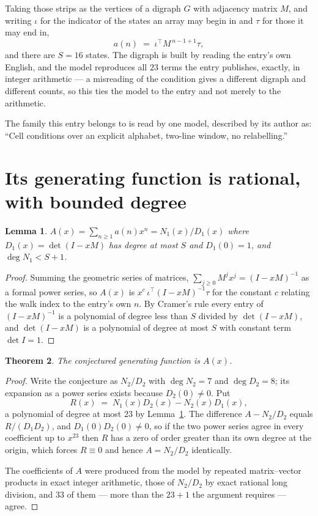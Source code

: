 \documentclass[11pt,a4paper]{article}
\theoremstyle{plain}
\newtheorem{theorem}{Theorem}
\newtheorem{lemma}[theorem]{Lemma}
\theoremstyle{definition}
\begin{document}
Taking those strips as the vertices of a digraph $G$ with adjacency matrix $M$, and writing
$\iota$ for the indicator of the states an array may begin in and $\tau$ for those it may end
in,
\[
a(n)\;=\;\iota^{\!\top}M^{\,n-1+1}\tau ,
\]
and there are $S=16$ states. The digraph is built by reading the entry's own English, and the
model reproduces all $23$ terms the entry publishes, exactly, in integer arithmetic --- a
misreading of the condition gives a different digraph and different counts, so this ties the
model to the entry and not merely to the arithmetic.

The family this entry belongs to is read by one model, described by its author as: ``Cell conditions over an explicit alphabet, two-line window, no relabelling.''


\section{Its generating function is rational, with bounded degree}

\begin{lemma}\label{lem:rat}
$A(x)=\sum_{n\ge1}a(n)x^n=N_1(x)/D_1(x)$ where $D_1(x)=\det(I-xM)$ has degree at most
$S$ and $D_1(0)=1$, and $\deg N_1<S+1$.
\end{lemma}

\begin{proof}
Summing the geometric series of matrices, $\sum_{j\ge0}M^jx^j=(I-xM)^{-1}$ as a formal
power series, so $A(x)$ is $x^{c}\,\iota^{\!\top}(I-xM)^{-1}\tau$ for the constant $c$
relating the walk index to the entry's own $n$. By Cramer's rule every entry of
$(I-xM)^{-1}$ is a polynomial of degree less than $S$ divided by $\det(I-xM)$, and
$\det(I-xM)$ is a polynomial of degree at most $S$ with constant term $\det I=1$.
\end{proof}

\begin{theorem}
The conjectured generating function is $A(x)$.
\end{theorem}

\begin{proof}
Write the conjecture as $N_2/D_2$ with $\deg N_2=7$ and $\deg D_2=8$; its expansion as a
power series exists because $D_2(0)\neq0$. Put
\[
R(x)\;=\;N_1(x)D_2(x)-N_2(x)D_1(x),
\]
a polynomial of degree at most $23$ by Lemma~\ref{lem:rat}. The difference
$A-N_2/D_2$ equals $R/(D_1D_2)$, and $D_1(0)D_2(0)\neq0$, so if the two power series agree in
every coefficient up to $x^{23}$ then $R$ has a zero of order greater than its own
degree at the origin, which forces $R\equiv0$ and hence $A=N_2/D_2$ identically.

The coefficients of $A$ were produced from the model by repeated matrix--vector products in
exact integer arithmetic, those of $N_2/D_2$ by exact rational long division, and $33$
of them --- more than the $23+1$ the argument requires --- agree.
\end{proof}
\end{document}
